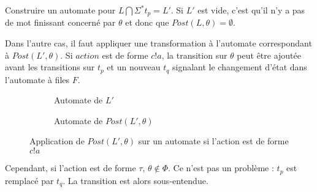 Construire un automate pour $L\bigcap\Sigma^*t_p=L'$. Si $L'$ est vide, c'est qu'il n'y a pas de mot finissant concerné par $\theta$ et donc que $Post(L,\theta)=\emptyset$.

Dans l'autre cas, il faut appliquer une transformation à l'automate correspondant à $Post(L',\theta)$.
Si $action$ est de forme $c!a$, la transition sur $\theta$ peut être ajoutée avant les transitions sur $t_p$ et un nouveau $t_q$ signalant le changement d'état dans l'automate à files $F$.

\begin{figure}[H]
    \centering
    \begin{subfigure}{0.5\linewidth}
        \centering
        \caption{Automate de $L'$}
    \end{subfigure}\hfill
    \begin{subfigure}{0.5\linewidth}
        \centering
        \caption{Automate de $Post(L',\theta)$}
    \end{subfigure}
    \caption{Application de $Post(L',\theta)$ sur un automate si l'action est de forme $c!a$}
\end{figure}

Cependant, si l'action est de forme $\tau$, $\theta\notin\Phi$. Ce n'est pas un problème : $t_p$ est remplacé par $t_q$. La transition est alors sous-entendue.

